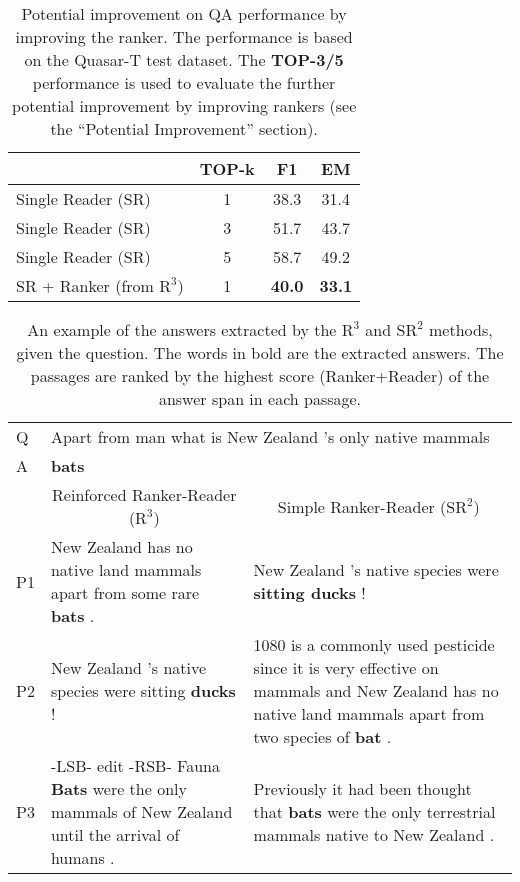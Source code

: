 \documentclass[letterpaper]{article} \usepackage{aaai18}  \usepackage{times}  \usepackage{helvet}  \usepackage{courier}  \usepackage{url}  \usepackage{graphicx}  \usepackage{comment}
\begin{document}
\begin{table}[h]
\centering
\begin{tabular}{lccc}
\toprule
                 & TOP-k & F1            & EM \\
                  \midrule
Single Reader (SR) & 1 & 38.3 & 31.4 \\
Single Reader (SR) & 3 & 51.7 & 43.7 \\
Single Reader (SR) & 5 & 58.7 & 49.2 \\
SR + Ranker (from $\text{R}^3$) & 1  & \textbf{40.0} & \textbf{33.1} \\
\bottomrule
                  \end{tabular}
\caption{Potential improvement on QA performance by improving the ranker. The performance is based on the Quasar-T test dataset.  
The \textbf{TOP-3/5} performance is used to evaluate the further potential improvement by improving rankers (see the ``Potential Improvement'' section).
}
\label{tab:analysis_upper}

\end{table}




\begin{table*}[]
\centering
\small
\begin{tabular}{lll}
\toprule
Q & \multicolumn{2}{l}{Apart from man what is New Zealand 's only native mammals}  \\
A  & \multicolumn{2}{l}{\textbf{bats}} \\
\midrule
         & \multicolumn{1}{c}{Reinforced Ranker-Reader ($\text{R}^3$)}                           & \multicolumn{1}{c}{Simple Ranker-Reader ($\text{SR}^2$)}                                                                                         \\
P1 & \multicolumn{1}{p{8cm}}{New Zealand has no native land mammals apart from some rare \textbf{bats} . } &\multicolumn{1}{p{8cm}}{ New Zealand 's native species were \textbf{sitting ducks} ! } \\
P2 & \multicolumn{1}{p{8cm}}{New Zealand 's native species were sitting \textbf{ducks} !   }  & 
\multicolumn{1}{p{8cm}}{1080 is a commonly used pesticide since it is very effective on mammals and New Zealand has no native land mammals apart from two species of \textbf{bat} .                          } \\
P3 & \multicolumn{1}{p{8cm}}{-LSB- edit -RSB- Fauna \textbf{Bats} were the only mammals of New Zealand until the arrival of humans . } & \multicolumn{1}{p{8cm}}{Previously it had been thought that \textbf{bats} were the only terrestrial mammals native to New Zealand .                             }
\\ \bottomrule
\end{tabular}
\normalsize
\caption{An example of the answers extracted by the $\text{R}^3$ and $\text{SR}^2$ methods, given the question. The words in bold are the extracted answers. The passages are ranked by the highest score (Ranker+Reader) of the answer span in each passage. 
}
\label{tab:analysis2}
\end{table*}
\end{document}
